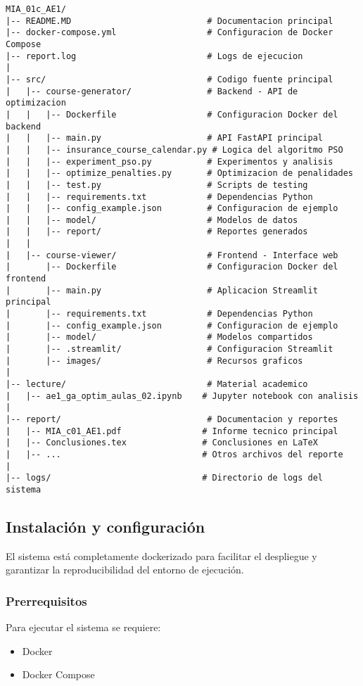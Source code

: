 \begin{verbatim}
MIA_01c_AE1/
|-- README.MD                           # Documentacion principal
|-- docker-compose.yml                  # Configuracion de Docker Compose
|-- report.log                          # Logs de ejecucion
|
|-- src/                                # Codigo fuente principal
|   |-- course-generator/               # Backend - API de optimizacion
|   |   |-- Dockerfile                  # Configuracion Docker del backend
|   |   |-- main.py                     # API FastAPI principal
|   |   |-- insurance_course_calendar.py # Logica del algoritmo PSO
|   |   |-- experiment_pso.py           # Experimentos y analisis
|   |   |-- optimize_penalties.py       # Optimizacion de penalidades
|   |   |-- test.py                     # Scripts de testing
|   |   |-- requirements.txt            # Dependencias Python
|   |   |-- config_example.json         # Configuracion de ejemplo
|   |   |-- model/                      # Modelos de datos
|   |   |-- report/                     # Reportes generados
|   |
|   |-- course-viewer/                  # Frontend - Interface web
|       |-- Dockerfile                  # Configuracion Docker del frontend
|       |-- main.py                     # Aplicacion Streamlit principal
|       |-- requirements.txt            # Dependencias Python
|       |-- config_example.json         # Configuracion de ejemplo
|       |-- model/                      # Modelos compartidos
|       |-- .streamlit/                 # Configuracion Streamlit
|       |-- images/                     # Recursos graficos
|
|-- lecture/                            # Material academico
|   |-- ae1_ga_optim_aulas_02.ipynb    # Jupyter notebook con analisis
|
|-- report/                             # Documentacion y reportes
|   |-- MIA_c01_AE1.pdf                # Informe tecnico principal
|   |-- Conclusiones.tex               # Conclusiones en LaTeX
|   |-- ...                            # Otros archivos del reporte
|
|-- logs/                              # Directorio de logs del sistema
\end{verbatim}

\subsection{Instalación y configuración}

El sistema está completamente dockerizado para facilitar el despliegue y garantizar la reproducibilidad del entorno de ejecución.

\subsubsection{Prerrequisitos}
Para ejecutar el sistema se requiere:
\begin{itemize}
    \item Docker
    \item Docker Compose
\end{itemize}


